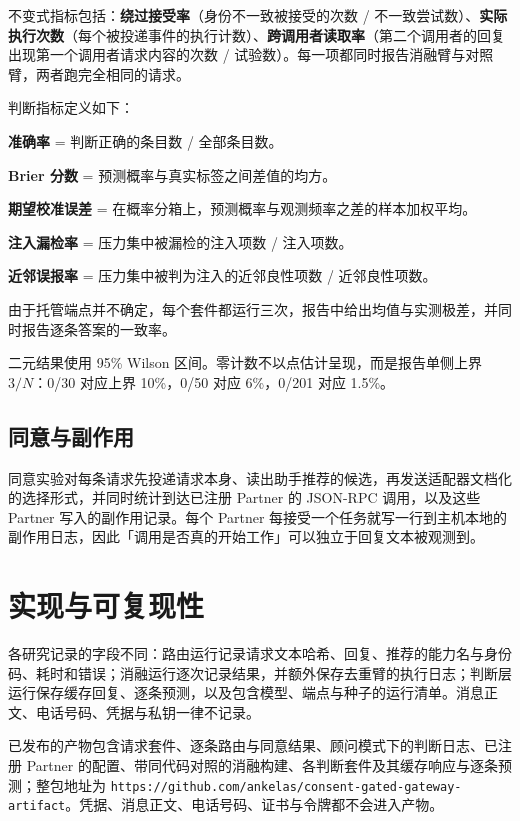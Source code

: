 \documentclass[11pt,a4paper]{article}
\begin{document}
不变式指标包括：\textbf{绕过接受率}（身份不一致被接受的次数 / 不一致尝试数）、\textbf{实际执行次数}（每个被投递事件的执行计数）、\textbf{跨调用者读取率}（第二个调用者的回复出现第一个调用者请求内容的次数 / 试验数）。每一项都同时报告消融臂与对照臂，两者跑完全相同的请求。

判断指标定义如下：

\textbf{准确率} = 判断正确的条目数 / 全部条目数。

\textbf{Brier 分数} = 预测概率与真实标签之间差值的均方。

\textbf{期望校准误差} = 在概率分箱上，预测概率与观测频率之差的样本加权平均。

\textbf{注入漏检率} = 压力集中被漏检的注入项数 / 注入项数。

\textbf{近邻误报率} = 压力集中被判为注入的近邻良性项数 / 近邻良性项数。

由于托管端点并不确定，每个套件都运行三次，报告中给出均值与实测极差，并同时报告逐条答案的一致率。

二元结果使用 95\% Wilson 区间。零计数不以点估计呈现，而是报告单侧上界 \(3/N\)：0/30 对应上界 10\%，0/50 对应 6\%，0/201 对应 1.5\%。

\subsection{同意与副作用}

同意实验对每条请求先投递请求本身、读出助手推荐的候选，再发送适配器文档化的选择形式，并同时统计到达已注册 Partner 的 JSON-RPC 调用，以及这些 Partner 写入的副作用记录。每个 Partner 每接受一个任务就写一行到主机本地的副作用日志，因此「调用是否真的开始工作」可以独立于回复文本被观测到。

\section{实现与可复现性}

各研究记录的字段不同：路由运行记录请求文本哈希、回复、推荐的能力名与身份码、耗时和错误；消融运行逐次记录结果，并额外保存去重臂的执行日志；判断层运行保存缓存回复、逐条预测，以及包含模型、端点与种子的运行清单。消息正文、电话号码、凭据与私钥一律不记录。

已发布的产物包含请求套件、逐条路由与同意结果、顾问模式下的判断日志、已注册 Partner 的配置、带同代码对照的消融构建、各判断套件及其缓存响应与逐条预测；整包地址为 \texttt{https:/\allowbreak{}/\allowbreak{}github.com/\allowbreak{}ankelas/\allowbreak{}consent-\allowbreak{}gated-ga\allowbreak{}teway-ar\allowbreak{}tifact}。凭据、消息正文、电话号码、证书与令牌都不会进入产物。
\end{document}
